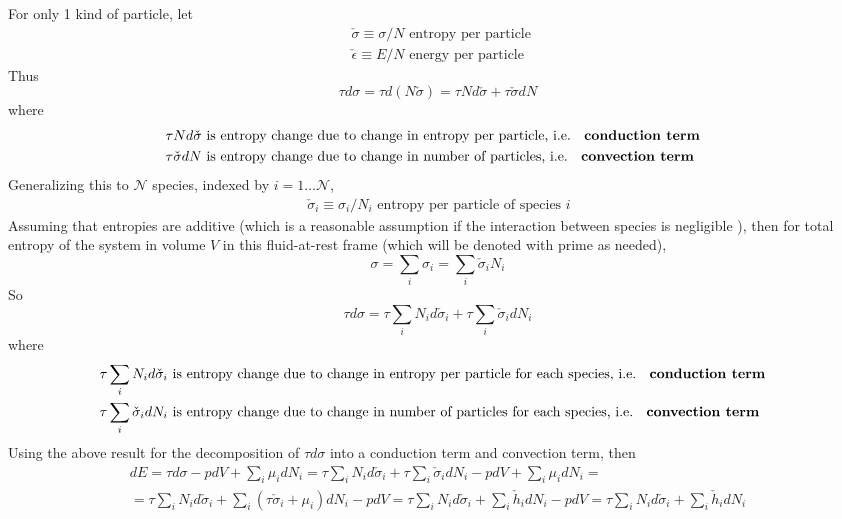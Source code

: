 \documentclass[10pt]{amsart}
\begin{document}
\begin{multicols*}{2}
\begin{enumerate}
For only 1 kind of particle, let 
\[
\begin{aligned}
  & \check{\sigma} \equiv \sigma/N \text{ entropy per particle } \\ 
  & \check{\epsilon} \equiv E/N \text{ energy per particle }
\end{aligned}
\]
Thus
\[
\tau d\sigma = \tau d(N \check{\sigma}) = \tau N d\check{\sigma} + \tau \check{\sigma} dN
\]
where 
\[
\begin{aligned}
  & \tau N d\check{\sigma} \text{ is entropy change due to change in entropy per particle, i.e. \textbf{ conduction term } } \\
  & \tau \check{\sigma} dN \text{ is entropy change due to change in number of particles, i.e. \textbf{ convection term } }
\end{aligned}
\]
Generalizing this to $\mathcal{N}$ species, indexed by $i=1\dots \mathcal{N}$, 
\[
\begin{aligned}
  & \check{\sigma}_i \equiv \sigma_i/N_i \text{ entropy per particle of species $i$ } 
\end{aligned}
\]
Assuming that entropies are additive (which is a reasonable assumption if the interaction between species is negligible \cite{LLandauELifshitz1980}), then for total entropy of the system in volume $V$ in this fluid-at-rest frame (which will be denoted with prime as needed), 
\[
\sigma = \sum_i \sigma_i = \sum_i \check{\sigma}_i N_i
\]
So
\[
\tau d\sigma = \tau \sum_i N_i d\check{\sigma}_i + \tau \sum_i \check{\sigma}_i dN_i
\]
where 
\[
\begin{aligned}
  & \tau \sum_i N_i d\check{\sigma}_i \text{ is entropy change due to change in entropy per particle for each species, i.e. \textbf{ conduction term } } \\
  & \tau \sum_i \check{\sigma}_i dN_i \text{ is entropy change due to change in number of particles for each species, i.e. \textbf{ convection term } }
\end{aligned}
\]
Using the above result for the decomposition of $\tau d\sigma$ into a conduction term and convection term, then
\begin{equation}\label{Eq:dEconductionconvectiondecomposition}
\begin{gathered}
  dE = \tau d\sigma - p dV + \sum_i \mu_i dN_i = \tau \sum_i N_i d\check{\sigma}_i + \tau \sum_i \check{\sigma}_i dN_i - pdV + \sum_i \mu_i dN_i = \\
  = \tau \sum_i N_i d\check{\sigma}_i + \sum_i ( \tau \check{\sigma}_i + \mu_i ) dN_i - pdV = \tau \sum_i N_i d\check{\sigma}_i + \sum_i \check{h}_i dN_i - pdV = \tau \sum_i N_i d\check{\sigma}_i + \sum_i \check{h}_i dN_i 

\end{gathered}
\end{equation}
\end{enumerate}
\end{multicols*}
\end{document}
